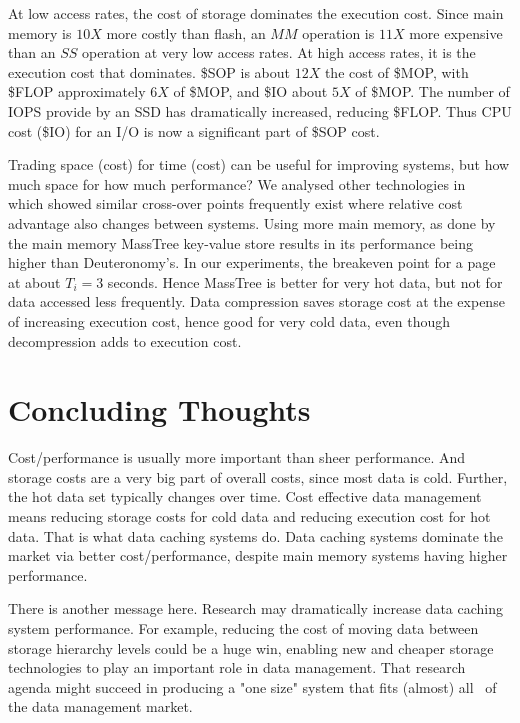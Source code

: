 \documentclass[11pt]{article}
\begin{document}
At low access rates, the cost of storage dominates the execution cost.  Since main memory is $10X$ more costly than flash, an $MM$ operation is $11X$ more expensive than an $SS$ operation at very low access rates.  At high access rates, it is the execution cost that dominates.  \$SOP is about $12X$ the cost of \$MOP, with \$FLOP approximately $6X$ of \$MOP, and \$IO about $5X$ of \$MOP.  The number of IOPS provide by an SSD has dramatically increased, reducing \$FLOP. Thus CPU cost (\$IO) for an I/O is now a significant part of \$SOP cost. 


Trading space (cost) for time (cost) can be useful for improving systems, but how much space for how much performance?  We analysed other technologies in~\cite{Damon} which showed similar cross-over points frequently exist where relative cost advantage also changes between systems.  Using more main memory, as done by the main memory MassTree key-value store results in its performance being higher than Deuteronomy's.  In our experiments, the breakeven point for a page at about $T_i = 3$ seconds.  Hence MassTree is better for very hot data, but not for data accessed less frequently.  Data compression saves storage cost at the expense of increasing execution cost, hence good for very cold data, even though decompression adds to execution cost.  

\vspace{-.1cm}
\section{Concluding Thoughts}

Cost/performance is usually more important than sheer performance.  And storage costs are a very big part of overall costs, since most data is cold.  Further, the hot data set typically changes over time.  Cost effective data management means reducing storage costs for cold data and reducing execution cost for hot data.  That is what data caching systems do. Data caching systems dominate the market via better cost/performance, despite main memory systems having higher performance.  

There is another message here.  Research may dramatically increase data caching system performance.  For example, reducing the cost of moving data between storage hierarchy levels could be a huge win, enabling new and cheaper storage technologies to play an important role in data management.  That research agenda might succeed in producing a "one size" system that fits (almost) all~\cite{onesizefitsall} of the data management market.
\end{document}
